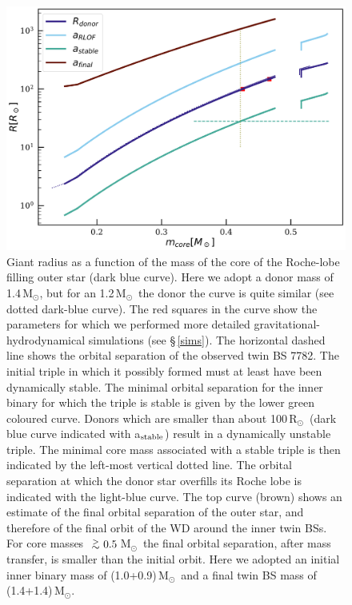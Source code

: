 \documentclass{aastex62}
\newcommand{\MSun}{\mbox{M$_\odot$}}
\newcommand{\RSun}{\mbox{R$_\odot$}}
\def\apgt{\ {\raise-.5ex\hbox{$\buildrel>\over\sim$}}\ }
\begin{document}
\begin{figure}[ht!]
  \includegraphics[width=\columnwidth]{fig_M14MSun_outerorbit.pdf}
  \caption{Giant radius as a function of the mass of the core of the
    Roche-lobe filling outer star (dark blue curve).  Here we adopt
    a donor mass of 1.4\,\MSun, but for an 1.2\,\MSun\, the donor the curve is
    quite similar (see dotted dark-blue curve).  The red squares in
    the curve show the parameters for which we performed more detailed
    gravitational-hydrodynamical simulations (see \S\,\ref{sims}).
    The horizontal dashed line shows the orbital separation of the
    observed twin BS 7782.  The initial triple in which it
    possibly formed must at least have been dynamically stable. The
    minimal orbital separation for the inner binary for which the
    triple is stable is given by the lower green coloured curve.
    Donors which are smaller than about 100\,\RSun\, (dark blue curve
    indicated with a$_{\rm stable}$) result in a dynamically unstable
    triple. The minimal core mass associated with a stable triple is
    then indicated by the left-most vertical dotted line.  The
    orbital separation at which the donor star overfills its Roche
    lobe is indicated with the light-blue curve. The top curve (brown)
    shows an estimate of the final orbital separation of the outer star,
    and therefore of the final orbit of the WD around the
    inner twin BSs.  For core masses $\apgt 0.5$\,\MSun\,
    the final orbital separation, after mass transfer, is smaller
    than the initial orbit.  Here we adopted an initial inner binary
    mass of (1.0+0.9)\,\MSun\, and a final twin BS mass of
    (1.4+1.4)\,\MSun.
\label{fig:tertiarymass_vs_size}}
\end{figure}
\end{document}
